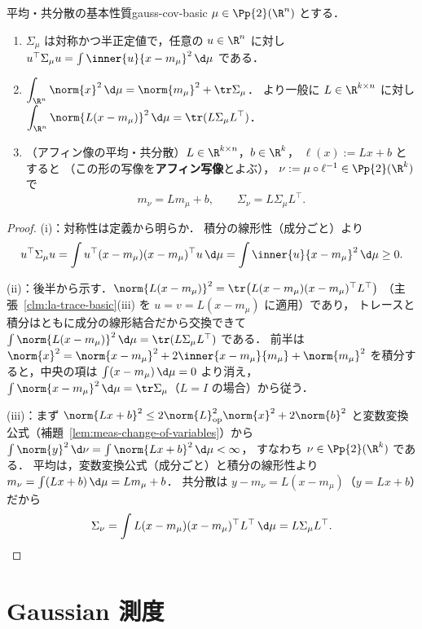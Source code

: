 \begin{claim}{平均・共分散の基本性質}{gauss-cov-basic}
  $\mu\in\Pp{2}(\R^n)$ とする．
  \begin{enumerate}
    \item $\Sigma_\mu$ は対称かつ半正定値で，任意の $u\in\R^n$ に対し
      $u^\top\Sigma_\mu u=\int\inner{u}{x-m_\mu}^2\,\d\mu$ である．
    \item $\displaystyle\int_{\R^n}\norm{x}^2\,\d\mu
      =\norm{m_\mu}^2+\tr\Sigma_\mu$．
      より一般に $L\in\R^{k\times n}$ に対し
      $\displaystyle\int_{\R^n}\norm{L(x-m_\mu)}^2\,\d\mu=\tr(L\Sigma_\mu L^\top)$．
    \item （アフィン像の平均・共分散）$L\in\R^{k\times n}$，$b\in\R^k$，
      $\ell(x):=Lx+b$ とすると
      （この形の写像を\textbf{アフィン写像}とよぶ），
      $\nu:=\mu\circ\ell^{-1}\in\Pp{2}(\R^k)$ で
      \[
        m_\nu=Lm_\mu+b,
        \qquad
        \Sigma_\nu=L\Sigma_\mu L^\top.
      \]
  \end{enumerate}
\end{claim}

\begin{proof}
  (i)：対称性は定義から明らか．
  積分の線形性（成分ごと）より
  \[
    u^\top\Sigma_\mu u
    =\int u^\top(x-m_\mu)(x-m_\mu)^\top u\,\d\mu
    =\int\inner{u}{x-m_\mu}^2\,\d\mu\geq0.
  \]

  (ii)：後半から示す．$\norm{L(x-m_\mu)}^2=\tr\bigl(L(x-m_\mu)(x-m_\mu)^\top L^\top\bigr)$
  （主張~\ref{clm:la-trace-basic}(iii) を $u=v=L(x-m_\mu)$ に適用）であり，
  トレースと積分はともに成分の線形結合だから交換できて
  $\int\norm{L(x-m_\mu)}^2\,\d\mu=\tr(L\Sigma_\mu L^\top)$ である．
  前半は
  $\norm{x}^2=\norm{x-m_\mu}^2+2\inner{x-m_\mu}{m_\mu}+\norm{m_\mu}^2$
  を積分すると，中央の項は $\int(x-m_\mu)\,\d\mu=0$ より消え，
  $\int\norm{x-m_\mu}^2\,\d\mu=\tr\Sigma_\mu$（$L=I$ の場合）から従う．

  (iii)：まず
  $\norm{Lx+b}^2\leq2\norm{L}_{\mathrm{op}}^2\norm{x}^2+2\norm{b}^2$
  と変数変換公式（補題~\ref{lem:meas-change-of-variables}）から
  $\int\norm{y}^2\,\d\nu=\int\norm{Lx+b}^2\,\d\mu<\infty$，
  すなわち $\nu\in\Pp{2}(\R^k)$ である．
  平均は，変数変換公式（成分ごと）と積分の線形性より
  $m_\nu=\int(Lx+b)\,\d\mu=Lm_\mu+b$．
  共分散は $y-m_\nu=L(x-m_\mu)$（$y=Lx+b$）だから
  \[
    \Sigma_\nu
    =\int L(x-m_\mu)(x-m_\mu)^\top L^\top\,\d\mu
    =L\Sigma_\mu L^\top.  \qedhere
  \]
\end{proof}

\section{Gaussian 測度}
\label{sec:gauss-measure}

